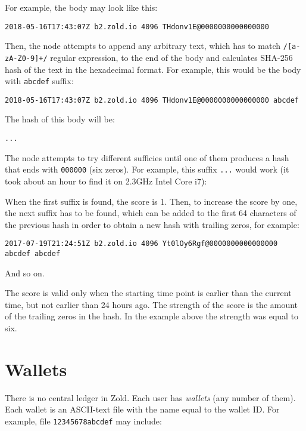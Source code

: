 \documentclass[11pt,oneside]{article}
\newcommand\dd[1]{\colorbox{gray!30}{\texttt{#1}}}
\begin{document}
For example, the body may look like this:

\begin{verbatim}
2018-05-16T17:43:07Z b2.zold.io 4096 THdonv1E@0000000000000000
\end{verbatim}

Then, the node attempts to append any arbitrary text, which has to match
\dd{/[a-zA-Z0-9]+/} regular expression, to the end of the body and calculates
SHA-256 hash of the text in the hexadecimal format. For example, this would be the body
with \dd{abcdef} suffix:

\begin{verbatim}
2018-05-16T17:43:07Z b2.zold.io 4096 THdonv1E@0000000000000000 abcdef
\end{verbatim}

The hash of this body will be:

\begin{verbatim}
...
\end{verbatim}

The node attempts to try different sufficies until one of them produces
a hash that ends with \dd{000000} (six zeros). For example, this
suffix \dd{...} would work
(it took about an hour to find it on 2.3GHz Intel Core i7):

When the first suffix is found, the score is 1. Then, to
increase the score by one, the next suffix has to be found, which
can be added to the first 64 characters of the previous hash
in order to obtain a new hash with trailing zeros, for example:

\begin{verbatim}
2017-07-19T21:24:51Z b2.zold.io 4096 Yt0lOy6Rgf@0000000000000000 abcdef abcdef
\end{verbatim}

And so on.

The score is valid only when the starting time point is earlier than
the current time, but not earlier than 24 hours ago. The strength of the score
is the amount of the trailing zeros in the hash. In the example above the
strength was equal to six.

\section{Wallets}

There is no central ledger in Zold.
Each user has \emph{wallets} (any number of them).
Each wallet is an ASCII-text file with the name equal to the wallet ID.
For example, file \dd{12345678abcdef} may include:
\end{document}
